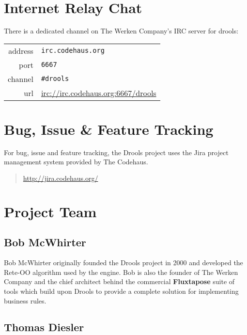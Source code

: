 \clearpage

\section{Internet Relay Chat}

There is a dedicated channel on The Werken Company's IRC server for
drools:\\

\begin{tabular}{rl}
address & \verb|irc.codehaus.org| \\
port    & \verb|6667| \\
channel & \verb|#drools|\\
url     & \url{irc://irc.codehaus.org:6667/drools}\\
\end{tabular}

\bigskip

\section{Bug, Issue \& Feature Tracking}

For bug, issue and feature tracking, the Drools project uses the
Jira project management system provided by The Codehaus.

\begin{quote}
    \url{http://jira.codehaus.org/}
\end{quote}

\clearpage

\section{Project Team}

\subsection{Bob McWhirter}

Bob McWhirter originally founded the Drools project in 2000 and
developed the Rete-OO algorithm used by the engine.  Bob is also
the founder of The Werken Company and the chief architect behind
the commercial \textbf{Fluxtapose} suite of tools which build
upon Drools to provide a complete solution for implementing
business rules.

\subsection{Thomas Diesler}

